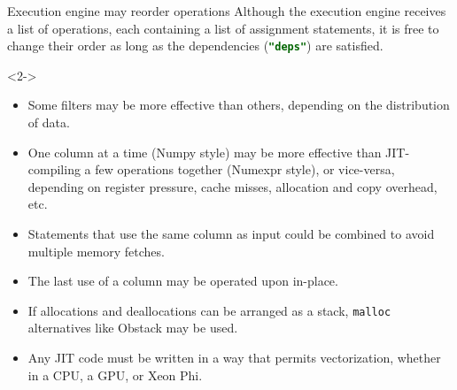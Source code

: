 \documentclass{beamer}
\begin{document}
\begin{frame}{Execution engine may reorder operations}
\vspace{0.4 cm}
Although the execution engine receives a list of operations, each containing a list of assignment statements, it is free to change their order as long as the dependencies (\textcolor{darkgreen}{\small\bf\texttt{"deps"}}) are satisfied.
\begin{uncoverenv}<2->
\begin{itemize}
\item Some filters may be more effective than others, depending on the distribution of data.
\item One column at a time (Numpy style) may be more effective than JIT-compiling a few operations together (Numexpr style), or vice-versa, depending on register pressure, cache misses, allocation and copy overhead, etc.
\item Statements that use the same column as input could be combined to avoid multiple memory fetches.
\item The last use of a column may be operated upon in-place.
\item If allocations and deallocations can be arranged as a stack, {\tt malloc} alternatives like Obstack may be used.
\item Any JIT code must be written in a way that permits vectorization, whether in a CPU, a GPU, or Xeon Phi.
\end{itemize}
\end{uncoverenv}
\end{frame}
\end{document}
